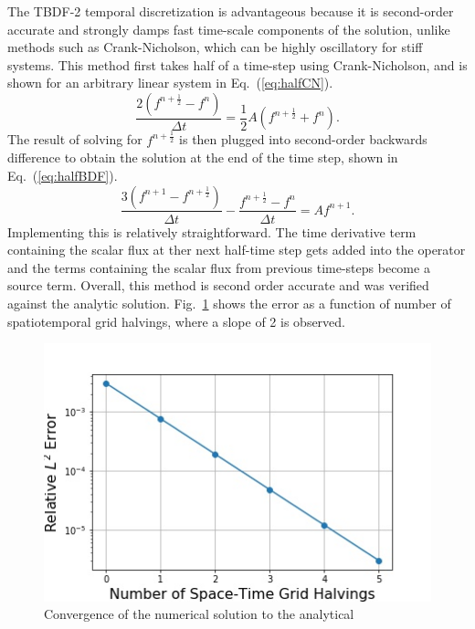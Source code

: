 \documentclass{style/nseJournal}
\newcommand{\fn}[1]{\left( #1 \right)}
\newcommand{\be}{\begin{equation}}
\newcommand{\ee}{\end{equation}}
\newcommand{\LEQ}[1]{\label{eq:#1}}
\newcommand{\EQ}[1]{Eq.~(\ref{eq:#1})}
\newcommand{\LFI}[1]{\label{fi:#1}}
\newcommand{\FI}[1]{Fig.~\ref{fi:#1}}
\newcommand{\bfg}{\begin{figure}}
\newcommand{\efg}{\end{figure}}
\newcommand{\half}{\frac{1}{2}}
\begin{document}
The TBDF-2 temporal discretization is advantageous because it is second-order accurate and strongly damps fast time-scale components of the solution, unlike methods such as Crank-Nicholson, which can be highly oscillatory for stiff systems.  
This method first takes half of a time-step using Crank-Nicholson, and is shown for an arbitrary linear system in \EQ{halfCN}.  
\be
	\frac{2 \fn{ f^{n+\half} - f^n }}{\Delta t} =  \half A \fn{f^{n+\half} + f^n}.
	\LEQ{halfCN} 
\ee
The result of solving for $f^{n+\half}$ is then plugged into second-order backwards difference to obtain the solution at the end of the time step, shown in \EQ{halfBDF}.  
\be
	\frac{3 \fn{ f^{n+1} - f^{n+\half} }}{\Delta t} - \frac{f^{n+\half} - 
		f^n}{\Delta t} = A f^{n+1}.
	\LEQ{halfBDF} 
\ee 
Implementing this is relatively straightforward. 
The time derivative term containing the scalar flux at ther next half-time step gets added into the operator and the terms containing the scalar flux from previous time-steps become a source term.  
Overall, this method is second order accurate and was verified against the analytic solution.  
\FI{2ord} shows the error as a function of number of spatiotemporal grid halvings, where a slope of 2 is observed.
\bfg[h] \centering
	\includegraphics[scale=0.5]{figures/method_convergence.jpg}
	\caption{Convergence of the numerical solution to the analytical}
	\LFI{2ord}
\efg
\end{document}

